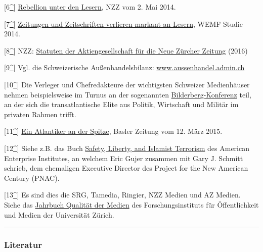 {[}6\protect\hyperlink{anmb6}{\^{}}{]}
\href{http://www.nzz.ch/meinung/blogs/medienblog/312/2014/05/02/rebellion-unter-den-lesern/}{Rebellion
unter den Lesern}, NZZ vom 2. Mai 2014.

{[}7\protect\hyperlink{anmb7}{\^{}}{]}
\href{http://www.persoenlich.com/medien/zeitungen-und-zeitschriften-verlieren-markant-an-lesern-319976}{Zeitungen
und Zeitschriften verlieren markant an Lesern}, WEMF Studie 2014.

{[}8\protect\hyperlink{anmb8}{\^{}}{]} NZZ:
\href{https://swprs.files.wordpress.com/2019/03/statuten_nzz_2016.pdf}{Statuten
der Aktiengesellschaft für die Neue Zürcher Zeitung} (2016)

{[}9\protect\hyperlink{anmb9}{\^{}}{]} Vgl. die Schweizerische
Außenhandelsbilanz:
\href{http://www.aussenhandel.admin.ch}{www.aussenhandel.admin.ch}

{[}10\protect\hyperlink{anmb10}{\^{}}{]} Die Verleger und Chefredakteure
der wichtigsten Schweizer Medienhäuser nehmen beispielsweise im Turnus
an der sogenannten
\href{https://swprs.org/die-konferenz/}{Bilderberg-Konferenz} teil, an
der sich die trans­atlantische Elite aus Politik, Wirtschaft und Militär
im privaten Rahmen trifft.

{[}11\protect\hyperlink{anmb11}{\^{}}{]}
\href{http://bazonline.ch/schweiz/Ein-Atlantiker-an-der-Spitze/story/18216373}{Ein
Atlantiker an der Spitze}, Basler Zeitung vom 12. März 2015.

{[}12\protect\hyperlink{anmb12}{\^{}}{]} Siehe z.B. das Buch
\href{https://www.amazon.com/Safety-Liberty-Islamist-Terrorism-Counterterrorism/dp/084474333X}{Safety,
Liberty, and Islamist Terrorism} des American Enterprise Institutes, an
welchem Eric Gujer zusammen mit Gary J. Schmitt schrieb, dem ehemaligen
Executive Director des Project for the New American Century (PNAC).

{[}13\protect\hyperlink{anmb13}{\^{}}{]} Es sind dies die SRG, Tamedia,
Ringier, NZZ Medien und AZ Medien. Siehe das
\href{http://www.foeg.uzh.ch/jahrbuch.html}{Jahrbuch Qualität der
Medien} des Forschungsinstituts für Öffentlichkeit und Medien der
Universität Zürich.

\begin{center}\rule{0.5\linewidth}{\linethickness}\end{center}

\hypertarget{literatur}{%
\subsubsection{Literatur}\label{literatur}}

